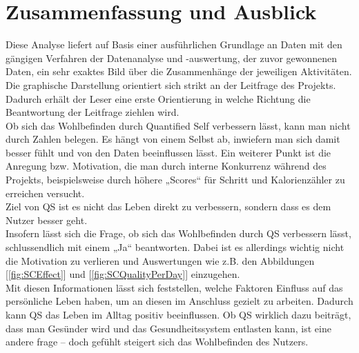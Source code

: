 
\chapter{Zusammenfassung und Ausblick}
\label{ch:Zusammenfassung}

Diese Analyse liefert auf Basis einer ausführlichen Grundlage an Daten mit den gängigen Verfahren der Datenanalyse und -auswertung, der zuvor gewonnenen Daten, ein sehr exaktes Bild über die Zusammenhänge der jeweiligen Aktivitäten.
Die graphische Darstellung orientiert sich strikt an der Leitfrage des Projekts. 
Dadurch erhält der Leser eine erste Orientierung in welche Richtung die Beantwortung der Leitfrage ziehlen wird.
\\
Ob sich das Wohlbefinden durch Quantified Self verbessern lässt, kann man nicht durch Zahlen belegen. 
Es hängt von einem Selbst ab, inwiefern man sich damit besser fühlt und von den Daten beeinflussen lässt.
Ein weiterer Punkt ist die Anregung bzw. Motivation, die man durch interne Konkurrenz während des Projekts, beispielsweise durch höhere „Scores“ für Schritt und Kalorienzähler zu erreichen versucht. \\
Ziel von QS ist es nicht das Leben direkt zu verbessern, sondern dass es dem Nutzer besser geht. \\
Insofern lässt sich die Frage, ob sich das Wohlbefinden durch QS verbessern lässt, schlussendlich mit einem „Ja“ beantworten.
Dabei ist es allerdings wichtig nicht die Motivation zu verlieren und Auswertungen wie z.B. den Abbildungen [\ref{fig:SCEffect}] und [\ref{fig:SCQualityPerDay}] einzugehen.\\
Mit diesen Informationen lässt sich feststellen, welche Faktoren Einfluss auf das persönliche Leben haben, um an diesen im Anschluss gezielt zu arbeiten.
Dadurch kann QS das Leben im Alltag positiv beeinflussen.
Ob QS wirklich dazu beiträgt, dass man Gesünder wird und das Gesundheitssystem entlasten kann, ist eine andere frage – doch gefühlt steigert sich das Wohlbefinden des Nutzers.

